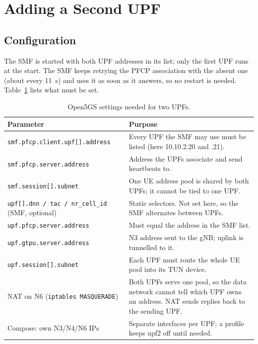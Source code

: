\documentclass[conference]{IEEEtran}
\begin{document}
\section{Adding a Second UPF}\label{sec:second}
\subsection{Configuration}
The SMF is started with both UPF addresses in its list; only the first UPF runs at the start. The SMF keeps retrying the PFCP association with the absent one (about every 11~s) and uses it as soon as it answers, so no restart is needed. Table~\ref{tab:cfg} lists what must be set.

\begin{table}[t]
\centering
\caption{Open5GS settings needed for two UPFs.}
\label{tab:cfg}
\footnotesize
\setlength{\tabcolsep}{3pt}
\begin{tabular}{>{\raggedright\arraybackslash}p{3.3cm}>{\raggedright\arraybackslash}p{4.6cm}}
\toprule
Parameter & Purpose \\
\midrule
\texttt{smf.\allowbreak pfcp.\allowbreak client.\allowbreak upf[].\allowbreak address} & Every UPF the SMF may use must be listed (here 10.10.2.20 and .21). \\
\texttt{smf.\allowbreak pfcp.\allowbreak server.\allowbreak address} & Address the UPFs associate and send heartbeats to. \\
\texttt{smf.\allowbreak session[].\allowbreak subnet} & One UE address pool is shared by both UPFs; it cannot be tied to one UPF. \\
\texttt{upf[].\allowbreak dnn / tac / nr\_cell\_id} (SMF, optional) & Static selectors. Not set here, so the SMF alternates between UPFs. \\
\texttt{upf.\allowbreak pfcp.\allowbreak server.\allowbreak address} & Must equal the address in the SMF list. \\
\texttt{upf.\allowbreak gtpu.\allowbreak server.\allowbreak address} & N3 address sent to the gNB; uplink is tunnelled to it. \\
\texttt{upf.\allowbreak session[].\allowbreak subnet} & Each UPF must route the whole UE pool into its TUN device. \\
NAT on N6 (\texttt{iptables MASQUERADE}) & Both UPFs serve one pool, so the data network cannot tell which UPF owns an address. NAT sends replies back to the sending UPF. \\
Compose: own N3/N4/N6 IPs & Separate interfaces per UPF; a profile keeps upf2 off until needed. \\
\bottomrule
\end{tabular}
\end{table}
\end{document}
